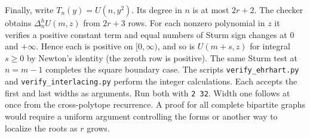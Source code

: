 Finally, write $T_n(y)=U(n,y^2)$. Its degree in $n$ is at most $2r+2$.
The checker obtains $\Delta_n^h U(m,z)$ from $2r+3$ rows. For each nonzero
polynomial in $z$ it verifies a positive constant term and equal numbers
of Sturm sign changes at $0$ and $+\infty$. Hence each is positive
on $[0,\infty)$, and so is $U(m+s,z)$ for integral $s\ge0$ by
Newton's identity (the zeroth row is positive). The same Sturm test at
$n=m-1$ completes the square boundary case.
The scripts \texttt{verify\_ehrhart.py} and \texttt{verify\_interlacing.py}
perform the integer calculations. Each accepts the first and last widths
as arguments. Run both with \texttt{2 32}. Width one follows at once from
the cross-polytope recurrence. A proof for all complete bipartite graphs
would require a uniform argument controlling the forms or another way to
localize the roots as $r$ grows.
